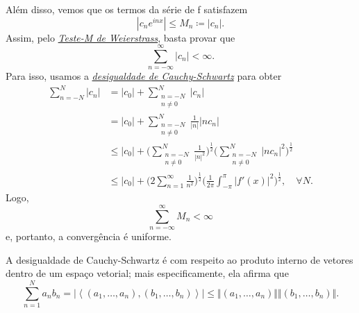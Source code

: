\documentclass[../pde_notes.tex]{subfiles}
\begin{document}
\begin{proof*}
	Além disso, vemos que os termos da série de f satisfazem
	\[
		|c_{n}e^{inx}|\leq M_{n}\coloneqq |c_{n}|.
	\]
	Assim, pelo \hyperlink{weierstrass_m}{\textit{Teste-M de Weierstrass}}, basta provar que
	\[
		\sum\limits_{n=-\infty}^{\infty}|c_{n}|<\infty.
	\]
	Para isso, usamos a \hyperlink{cauchy_schwartz}{\textit{desigualdade de Cauchy-Schwartz}}  para obter
	\begin{align*}
		\sum\limits_{n=-N}^{N}|c_{n}| & = |c_{0}| + \sum\limits_{\substack{n=-N                                                                                                                                       \\ n\neq0}}^{N}|c_{n}|\\
		                              & = |c_{0}| + \sum\limits_{\substack{n=-N                                                                                                                                       \\ n\neq0}}^{N}\frac{1}{|n|}|nc_{n}|\\
		                              & \leq |c_{0}|+\biggl(\sum\limits_{\substack{n=-N                                                                                                                               \\ n\neq0}}^{N}\frac{1}{|n|^{2}}\biggr)^{\frac{1}{2}}\biggl(\sum\limits_{\substack{n=-N \\ n\neq0}}^{N}|nc_{n}|^{2}\biggr)^{\frac{1}{2}}\\
		                              & \leq |c_{0}|+\biggl(2\sum\limits_{n=1}^{\infty}\frac{1}{n^{2}}\biggr)^{\frac{1}{2}}\biggl(\frac{1}{2\pi }\int_{-\pi }^{\pi }|f'(x)|^{2}\biggr)^{\frac{1}{2}},\quad \forall N.
	\end{align*}
	Logo,
	\[
		\sum\limits_{n=-\infty}^{\infty}M_{n}<\infty
	\]
	e, portanto, a convergência é uniforme. \qedsymbol
\end{proof*}
\begin{tcolorbox}[
		skin=enhanced,
		title=Lembrete!,
		after title={\hfill Desigualdade de Cauchy-Schwartz},
		fonttitle=\bfseries,
		sharp corners=downhill,
		colframe=black,
		colbacktitle=yellow!75!white,
		colback=yellow!30,
		colbacklower=black,
		coltitle=black,
		drop large lifted shadow
	]
	A desigualdade de Cauchy-Schwartz é com respeito ao produto interno de vetores dentro de um espaço vetorial; mais especificamente, ela afirma que
	\[
		\sum\limits_{n=1}^{N}a_{n}b_{n} = |\left< (a_1, \dotsc , a_{n}), (b_1, \dotsc , b_{n}) \right>|\leq \Vert (a_1, \dotsc , a_{n}) \Vert \Vert (b_1, \dotsc , b_{n}) \Vert.
	\]
\end{tcolorbox}
\end{document}
